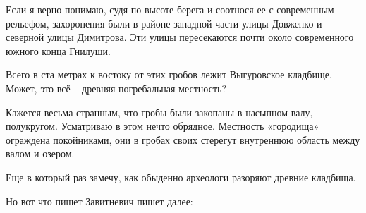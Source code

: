 Если я верно понимаю, судя по высоте берега и соотнося ее с современным рельефом, захоронения были в районе западной части улицы Довженко и северной улицы Димитрова. Эти улицы пересекаются почти около современного южного конца Гнилуши.

Всего в ста метрах к востоку от этих гробов лежит Выгуровское кладбище. Может, это всё – древняя погребальная местность?

Кажется весьма странным, что гробы были закопаны в насыпном валу, полукругом. Усматриваю в этом нечто обрядное. Местность «городища» ограждена покойниками, они в гробах своих стерегут внутреннюю область между валом и озером.

Еще в который раз замечу, как обыденно археологи разоряют древние кладбища.

Но вот что пишет Завитневич пишет далее:

